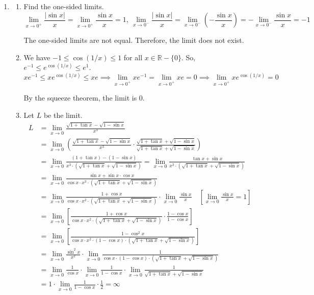 \documentclass[a4paper, 12pt]{article}
\begin{document}

\begin{enumerate}[leftmargin=*,label=\textbf{\arabic*.}]
\item
\begin{enumerate}[leftmargin=*,label=\textbf{\alph*.}]
\item Find the one-sided limits.
\[\lim_{x\to 0^+} \frac{\left|\sin x\right|}{x}=\lim_{x\to 0^+}\frac{\sin x}{x}=1,\:\lim_{x\to 0^-} \frac{\left|\sin x\right|}{x}=\lim_{x\to0^-}\left(-\frac{\sin x}{x}\right)=-\lim_{x\to0^-}\frac{\sin x}{x}=-1\]

The one-sided limits are not equal. Therefore, the limit does not exist.

\item We have $-1\leq\cos(1/x)\leq1$ for all $x\in\mathbb R-\{0\}$. So, $ e^{-1}\leq e^{\cos(1/x)}\leq e^1$.
\[x e^{-1}\leq x e^{\cos(1/x)}\leq x e\implies\lim_{x\to0^+} x e^{-1}=\lim_{x\to0^+}x e=0\implies\lim_{x\to0^+}x e^{\cos(1/x)}=\boxed0\]

By the squeeze theorem, the limit is 0.
\item Let $L $ be the limit.
\begin{align*}L&=\displaystyle\lim_{x\to0}\frac{\sqrt{1+\tan x}-\sqrt{1-\sin x}}{x^3}
\\[1em]&=\lim_{x\to0}\left(\frac{\sqrt{1+\tan x}-\sqrt{1-\sin x}}{x^3}\cdot\frac{\sqrt{1+\tan x}+\sqrt{1-\sin x}}{\sqrt{1+\tan x}+\sqrt{1-\sin x}}\right)\\[1em]&=\lim_{x\to0}\frac{(1+\tan x)-(1-\sin x)}{x^3\cdot\left(\sqrt{1+\tan x}+\sqrt{1-\sin x}\right)}=\lim_{x\to0}\frac{\tan x+\sin x}{x^3\cdot\left(\sqrt{1+\tan x}+\sqrt{1-\sin x}\right)}\\[1em]&=\lim_{x\to0}\frac{\sin x+\sin x\cdot\cos x}{\cos x\cdot x^3\cdot\left(\sqrt{1+\tan x}+\sqrt{1-\sin x}\right)}\\[1em]&=\lim_{x\to0}\frac{1+\cos x}{\cos x\cdot x^2\cdot\left(\sqrt{1+\tan x}+\sqrt{1-\sin x}\right)}\cdot\lim_{x\to0}\frac{\sin x}{x}\quad\left[\lim_{x\to0}\frac{\sin x}x=1\right]\\[1em]&=\lim_{x\to0}\left[\frac{1+\cos x}{\cos x\cdot x^2\cdot\left(\sqrt{1+\tan x}+\sqrt{1-\sin x}\right)}\cdot\frac{1-\cos x}{1-\cos x}\right]\\[1em]&=\lim_{x\to0}\left[\frac{1-\cos^2x}{\cos x\cdot x^2\cdot(1-\cos x)\cdot\left(\sqrt{1+\tan x}+\sqrt{1-\sin x}\right)}\right]\\[1em]&=\lim_{x\to0}\frac{\sin^2x}{x^2}\cdot\lim_{x\to0}\frac1{\cos x\cdot(1-\cos x)\cdot\left(\sqrt{1+\tan x}+\sqrt{1-\sin x}\right)}\\[1em]&=\lim_{x\to0}\frac1{\cos x}\cdot\lim_{x\to0}\frac1{1-\cos x}\cdot\lim_{x\to0}\frac1{\sqrt{1+\tan x}+\sqrt{1-\sin x}}\\[1em]&=1\cdot\lim_{x\to0}\frac1{1-\cos x}\cdot\frac12 =\boxed{\infty}\end{align*}
\end{enumerate}


\end{enumerate}
\end{document}
